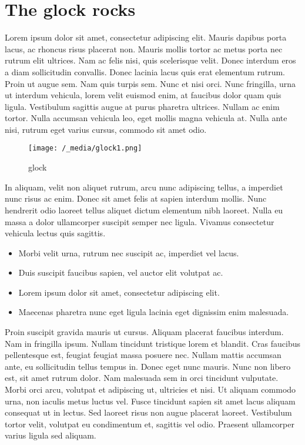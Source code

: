 \documentclass{article}
\begin{document}
\section{The glock rocks}\hypertarget{the-glock-rocks}{}\label{the-glock-rocks}

Lorem ipsum dolor sit amet, consectetur adipiscing elit. Mauris dapibus porta lacus, ac rhoncus risus placerat non. Mauris mollis tortor ac metus porta nec rutrum elit ultrices. Nam ac felis nisi, quis scelerisque velit. Donec interdum eros a diam sollicitudin convallis. Donec lacinia lacus quis erat elementum rutrum. Proin ut augue sem. Nam quis turpis sem. Nunc et nisi orci. Nunc fringilla, urna ut interdum vehicula, lorem velit euismod enim, at faucibus dolor quam quis ligula. Vestibulum sagittis augue at purus pharetra ultrices. Nullam ac enim tortor. Nulla accumsan vehicula leo, eget mollis magna vehicula at. Nulla ante nisi, rutrum eget varius cursus, commodo sit amet odio.

\begin{figure}
\begin{center}
\texttt{[image: /\_media/glock1.png]}
\end{center}
\caption{glock}

\end{figure}

In aliquam, velit non aliquet rutrum, arcu nunc adipiscing tellus, a imperdiet nunc risus ac enim. Donec sit amet felis at sapien interdum mollis. Nunc hendrerit odio laoreet tellus aliquet dictum elementum nibh laoreet. Nulla eu massa a dolor ullamcorper suscipit semper nec ligula. Vivamus consectetur vehicula lectus quis sagittis.

\begin{itemize}
\item Morbi velit urna, rutrum nec suscipit ac, imperdiet vel lacus.
\item Duis suscipit faucibus sapien, vel auctor elit volutpat ac.
\item Lorem ipsum dolor sit amet, consectetur adipiscing elit.
\item Maecenas pharetra nunc eget ligula lacinia eget dignissim enim malesuada.
\end{itemize}

Proin suscipit gravida mauris ut cursus. Aliquam placerat faucibus interdum. Nam in fringilla ipsum. Nullam tincidunt tristique lorem et blandit. Cras faucibus pellentesque est, feugiat feugiat massa posuere nec. Nullam mattis accumsan ante, eu sollicitudin tellus tempus in. Donec eget nunc mauris. Nunc non libero est, sit amet rutrum dolor. Nam malesuada sem in orci tincidunt vulputate. Morbi orci arcu, volutpat et adipiscing ut, ultricies et nisi. Ut aliquam commodo urna, non iaculis metus luctus vel. Fusce tincidunt sapien sit amet lacus aliquam consequat ut in lectus. Sed laoreet risus non augue placerat laoreet. Vestibulum tortor velit, volutpat eu condimentum et, sagittis vel odio. Praesent ullamcorper varius ligula sed aliquam.
\end{document}
